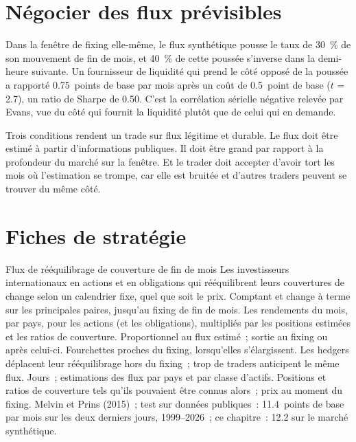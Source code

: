 \section{Négocier des flux prévisibles}

Dans la fenêtre de fixing elle-même, le flux synthétique pousse le taux de 30~\% de son mouvement de fin de mois, et 40~\% de cette poussée s'inverse dans la demi-heure suivante.
Un fournisseur de liquidité qui prend le côté opposé de la poussée a rapporté 0.75~points de base par mois après un coût de 0.5~point de base ($t$ = 2.7), un ratio de Sharpe de
0.50. C'est la corrélation sérielle négative relevée par Evans, vue du côté qui fournit la liquidité plutôt que de celui qui en demande.

Trois conditions rendent un trade sur flux légitime et durable. Le flux doit être estimé à partir d'informations publiques. Il doit être grand par rapport à la
profondeur du marché sur la fenêtre. Et le trader doit accepter d'avoir tort les mois où l'estimation se trompe, car elle est bruitée et
d'autres traders peuvent se trouver du même côté.

\section{Fiches de stratégie}

\begin{strategyfile}{Flux de rééquilibrage de couverture de fin de mois}\label{strat:s2:fx-flow-strategies:monthend}
 Les investisseurs internationaux en actions et en obligations qui rééquilibrent leurs couvertures de change selon un calendrier fixe, quel que soit
le prix.
 Comptant et change à terme sur les principales paires, jusqu'au fixing de fin de mois.
 Les rendements du mois, par pays, pour les actions (et les obligations), multipliés par les positions estimées et les ratios de couverture.
 Proportionnel au flux estimé~; sortie au fixing ou après celui-ci.
 Fourchettes proches du fixing, lorsqu'elles s'élargissent.
 Les hedgers déplacent leur rééquilibrage hors du fixing~; trop de traders anticipent le même flux.
 Jours~; estimations des flux par pays et par classe d'actifs.
 Positions et ratios de couverture tels qu'ils pouvaient être connus alors~; prix au moment du fixing.
 Melvin et Prins (2015)~; test sur données publiques~: 11.4~points de base par mois sur les deux derniers jours, 1999--2026~; ce chapitre~: 12.2 sur le
marché synthétique.
\end{strategyfile}

